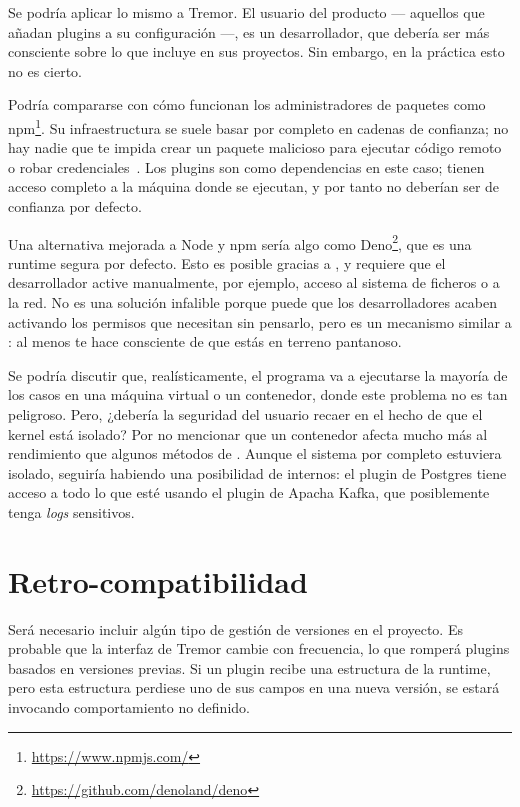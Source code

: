 Se podría aplicar lo mismo a Tremor. El usuario del producto --- aquellos que
añadan plugins a su configuración ---, es un desarrollador, que debería ser más
consciente sobre lo que incluye en sus proyectos. Sin embargo, en la práctica
esto no es cierto.

Podría compararse con cómo funcionan los administradores de paquetes como
npm\footnote{\url{https://www.npmjs.com/}}. Su infraestructura se suele basar
por completo en cadenas de confianza; no hay nadie que te impida crear un
paquete malicioso para ejecutar código remoto o robar
credenciales~\cite{npm1}\cite{npm2}. Los plugins son como dependencias en este
caso; tienen acceso completo a la máquina donde se ejecutan, y por tanto no
deberían ser de confianza por defecto.

Una alternativa mejorada a Node y npm sería algo como
Deno\footnote{\url{https://github.com/denoland/deno}}, que es una runtime segura
por defecto. Esto es posible gracias a \sandboxing, y requiere que el
desarrollador active manualmente, por ejemplo, acceso al sistema de ficheros o a
la red. No es una solución infalible porque puede que los desarrolladores acaben
activando los permisos que necesitan sin pensarlo, pero es un mecanismo similar
a \unsafe: al menos te hace consciente de que estás en terreno pantanoso.

Se podría discutir que, realísticamente, el programa va a ejecutarse la mayoría
de los casos en una máquina virtual o un contenedor, donde este problema no es
tan peligroso. Pero, ¿debería la seguridad del usuario recaer en el hecho de que
el kernel está isolado? Por no mencionar que un contenedor afecta mucho más al
rendimiento que algunos métodos de \sandboxing. Aunque el sistema por completo
estuviera isolado, seguiría habiendo una posibilidad de \leaks internos: el
plugin de Postgres tiene acceso a todo lo que esté usando el plugin de Apacha
Kafka, que posiblemente tenga \emph{logs} sensitivos.

\section{Retro-compatibilidad}\label{sec:compat}

Será necesario incluir algún tipo de gestión de versiones en el proyecto. Es
probable que la interfaz de Tremor cambie con frecuencia, lo que romperá plugins
basados en versiones previas. Si un plugin recibe una estructura de la runtime,
pero esta estructura perdiese uno de sus campos en una nueva versión, se estará
invocando comportamiento no definido.

